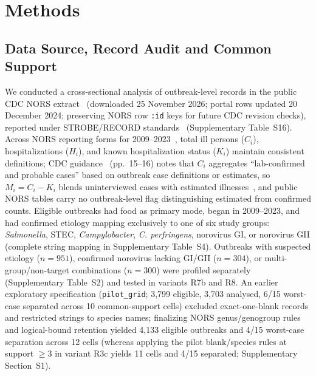 \section{Methods}\label{sec:methods}

\subsection{Data Source, Record Audit and Common Support}\label{sec:data}

We conducted a cross-sectional analysis of outbreak-level records in the public CDC NORS extract~\cite{cdc2024norsdata} (downloaded 25 November 2026; portal rows updated 20 December 2024; preserving NORS row \texttt{:id} keys for future CDC revision checks), reported under STROBE/RECORD standards~\cite{benchimol2015record} (Supplementary Table~S16). Across NORS reporting forms for 2009--2023~\cite{cdc2014norsguidance,wikswo2022enteric}, total ill persons ($C_i$), hospitalizations ($H_i$), and known hospitalization status ($K_i$) maintain consistent definitions; CDC guidance~\cite{cdc2014norsguidance} (pp.~15--16) notes that $C_i$ aggregates ``lab-confirmed and probable cases'' based on outbreak case definitions or estimates, so $M_i = C_i - K_i$ blends uninterviewed cases with estimated illnesses~\cite{jiang2018using}, and public NORS tables carry no outbreak-level flag distinguishing estimated from confirmed counts. Eligible outbreaks had food as primary mode, began in 2009--2023, and had confirmed etiology mapping exclusively to one of six study groups: \textit{Salmonella}, STEC, \textit{Campylobacter}, \textit{C. perfringens}, norovirus GI, or norovirus GII (complete string mapping in Supplementary Table~S4). Outbreaks with suspected etiology ($n = 951$), confirmed norovirus lacking GI/GII ($n = 304$), or multi-group/non-target combinations ($n = 300$) were profiled separately (Supplementary Table~S2) and tested in variants R7b and R8. An earlier exploratory specification (\texttt{pilot\_grid}; 3,799 eligible, 3,703 analysed, 6/15 worst-case separated across 10 common-support cells) excluded exact-one-blank records and restricted strings to species names; finalizing NORS genus/genogroup rules and logical-bound retention yielded 4,133 eligible outbreaks and 4/15 worst-case separation across 12 cells (whereas applying the pilot blank/species rules at support $\ge 3$ in variant R3c yields 11 cells and 4/15 separated; Supplementary Section~S1).

